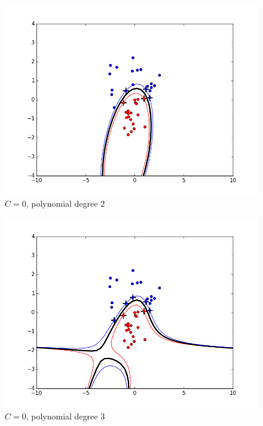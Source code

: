 \documentclass{article}
\begin{document}
\begin{figure}[H]
\centering
\includegraphics[scale = 0.5]{figure_basic_poly2.png}
\caption{$C=0$, polynomial degree 2}
\label{fig:1}
\end{figure}

\begin{figure}[H]
\centering
\includegraphics[scale = 0.5]{figure_basic_poly3.png}
\caption{$C=0$, polynomial degree 3}
\label{fig:2}
\end{figure}
\end{document}
